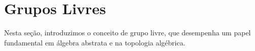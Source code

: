 \section{Grupos Livres}
\label{grupos-livres}

Nesta seção, introduzimos o conceito de grupo livre, que desempenha um papel fundamental em álgebra abstrata e na topologia algébrica.



